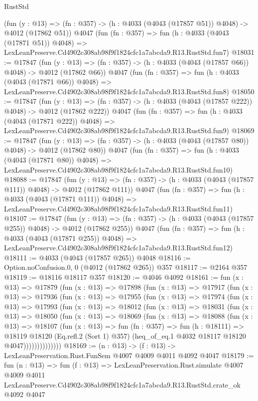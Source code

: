 \begin{lexlean}{RustStd}
\begin{coremodule}
    (fun (y : @13) => (fn : @357) -> (h : @4033 (@4043 (@17857 @51)) @4048) -> @4012 (@17862 @51))
    @4047
    (fun (fn : @357) =>
    fun (h : @4033 (@4043 (@17871 @51)) @4048) =>
    LexLeanPreserve.Cd4902c308ab98f9f1824cfc1a7abcda9.R13.RustStd.fun7)
@18031 := @17847
    (fun (y : @13) => (fn : @357) -> (h : @4033 (@4043 (@17857 @66)) @4048) -> @4012 (@17862 @66))
    @4047
    (fun (fn : @357) =>
    fun (h : @4033 (@4043 (@17871 @66)) @4048) =>
    LexLeanPreserve.Cd4902c308ab98f9f1824cfc1a7abcda9.R13.RustStd.fun8)
@18050 := @17847
    (fun (y : @13) => (fn : @357) -> (h : @4033 (@4043 (@17857 @222)) @4048) -> @4012 (@17862 @222))
    @4047
    (fun (fn : @357) =>
    fun (h : @4033 (@4043 (@17871 @222)) @4048) =>
    LexLeanPreserve.Cd4902c308ab98f9f1824cfc1a7abcda9.R13.RustStd.fun9)
@18069 := @17847
    (fun (y : @13) => (fn : @357) -> (h : @4033 (@4043 (@17857 @80)) @4048) -> @4012 (@17862 @80))
    @4047
    (fun (fn : @357) =>
    fun (h : @4033 (@4043 (@17871 @80)) @4048) =>
    LexLeanPreserve.Cd4902c308ab98f9f1824cfc1a7abcda9.R13.RustStd.fun10)
@18088 := @17847
    (fun (y : @13) => (fn : @357) -> (h : @4033 (@4043 (@17857 @111)) @4048) -> @4012 (@17862 @111))
    @4047
    (fun (fn : @357) =>
    fun (h : @4033 (@4043 (@17871 @111)) @4048) =>
    LexLeanPreserve.Cd4902c308ab98f9f1824cfc1a7abcda9.R13.RustStd.fun11)
@18107 := @17847
    (fun (y : @13) => (fn : @357) -> (h : @4033 (@4043 (@17857 @255)) @4048) -> @4012 (@17862 @255))
    @4047
    (fun (fn : @357) =>
    fun (h : @4033 (@4043 (@17871 @255)) @4048) =>
    LexLeanPreserve.Cd4902c308ab98f9f1824cfc1a7abcda9.R13.RustStd.fun12)
@18111 := @4033 (@4043 (@17857 @265)) @4048
@18116 := Option.noConfusion.{0, 0} (@4012 (@17862 @265)) @357
@18117 := @2164 @357
@18119 := @18116 @18117 @357
@18120 := @4046 @4092
@18161 := fun (x : @13) =>
  @17879
    (fun (x : @13) =>
    @17898
      (fun (x : @13) =>
      @17917
        (fun (x : @13) =>
        @17936
          (fun (x : @13) =>
          @17955
            (fun (x : @13) =>
            @17974
              (fun (x : @13) =>
              @17993
                (fun (x : @13) =>
                @18012
                  (fun (x : @13) =>
                  @18031
                    (fun (x : @13) =>
                    @18050
                      (fun (x : @13) =>
                      @18069
                        (fun (x : @13) =>
                        @18088
                          (fun (x : @13) =>
                          @18107
                            (fun (x : @13) =>
                            fun (fn : @357) =>
                            fun (h : @18111) =>
                            @18119
                              @18120
                              (Eq.refl.{2} (Sort 1) @357)
                              (heq_of_eq.{1} @4032 @18117 @18120 @4047))))))))))))))
@18169 := (n : @13) -> (f : @13) -> LexLeanPreservation.Rust.FunSem @4007 @4009 @4011 @4092 @4047
@18179 := fun (n : @13) =>
  fun (f : @13) =>
  LexLeanPreservation.Rust.simulate
    @4007
    @4009
    @4011
    LexLeanPreserve.Cd4902c308ab98f9f1824cfc1a7abcda9.R13.RustStd.crate_ok
    @4092
    @4047
\end{coremodule}
\end{lexlean}
